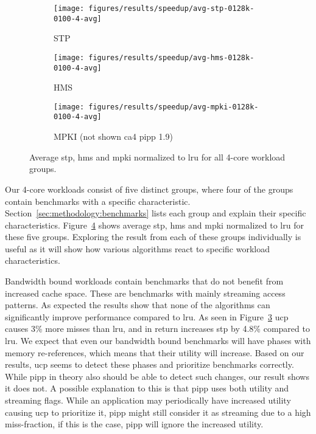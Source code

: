 \begin{figure}[th]
    \centering
    \begin{subfigure}[b]{0.5\textwidth}
        \texttt{[image: figures/results/speedup/avg-stp-0128k-0100-4-avg]}
        \caption{STP}
        \label{fig:results:base:4-avg:stp}
    \end{subfigure}%
    \begin{subfigure}[b]{0.5\textwidth}
        \texttt{[image: figures/results/speedup/avg-hms-0128k-0100-4-avg]}
        \caption{HMS}
        \label{fig:results:base:4-avg:hms}
    \end{subfigure}
    \begin{subfigure}[b]{0.5\textwidth}
        \texttt{[image: figures/results/speedup/avg-mpki-0128k-0100-4-avg]}
        \caption{MPKI (not shown ca4 pipp 1.9)}
        \label{fig:results:base:4-avg:mpki}
    \end{subfigure}
    \caption[Average result for 4-core workloads]{Average \gls{stp}, \gls{hms} and \gls{mpki} normalized to \gls{lru} for all 4-core workload groups.}
    \label{fig:results:base:4-avg} 
\end{figure}

Our 4-core workloads consist of five distinct groups, where four of the groups contain benchmarks with a specific characteristic.
Section~\ref{sec:methodology:benchmarks} lists each group and explain their specific characteristics.
Figure~\ref{fig:results:base:4-avg} shows average \gls{stp}, \gls{hms} and \gls{mpki} normalized to \gls{lru} for these five groups.
Exploring the result from each of these groups individually is useful as it will show how various algorithms react to specific workload characteristics.

Bandwidth bound workloads contain benchmarks that do not benefit from increased cache space.
These are benchmarks with mainly streaming access patterns. 
As expected the results show that none of the algorithms can significantly improve performance compared to \gls{lru}.
As seen in Figure~\ref{fig:results:base:4-avg:mpki} \gls{ucp} causes 3\% more misses than \gls{lru}, and in return increases \gls{stp} by 4.8\% compared to \gls{lru}.
We expect that even our bandwidth bound benchmarks will have phases with memory re-references, which means that their utility will increase.
Based on our results, \gls{ucp} seems to detect these phases and prioritize benchmarks correctly.
While \gls{pipp} in theory also should be able to detect such changes, our result shows it does not.
A possible explanation to this is that \gls{pipp} uses both utility and streaming flags.
While an application may periodically have increased utility causing \gls{ucp} to prioritize it, \gls{pipp} might still consider it as streaming due to a high miss-fraction, if this is the case, \gls{pipp} will ignore the increased utility.

